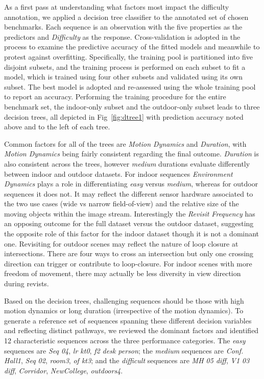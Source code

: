 As a first pass at understanding what factors most impact the difficulty
annotation, we applied a decision tree classifier to the annotated set of
chosen benchmarks.  Each sequence is an observation with the 
five
 properties as the predictors and \textit{Difficulty}
as the response. 
Cross-validation is adopted in the process to examine the predictive
accuracy of the fitted models and meanwhile to protest against overfitting.
Specifically, the training pool is partitioned into five disjoint subsets,
and the training process is performed on each subset to fit a model, which
is trained using four other subsets and validated using its own subset.
The best model is adopted and re-assessed using the whole training 
pool to report an accuracy.
Performing the training procedure for the entire benchmark set, the
indoor-only subset and the outdoor-only subset leads to three decision
trees, all depicted in Fig~\ref{fig:dtree1} with prediction accuracy noted 
above and to the left of each tree. 

Common factors for all of the trees are \textit{Motion Dynamics} and
\textit{Duration}, with \textit{Motion Dynamics} being fairly consistent
regarding the final outcome. \textit{Duration} is also consistent across
the trees, however \textit{medium} durations evaluate differently between
indoor and outdoor datasets.
For indoor sequences \textit{Environment Dynamics} plays a role in
differentiating \textit{easy} versus \textit{medium}, whereas for outdoor
sequences it does not. It may reflect the different sensor hardware
associated to the two use cases (wide vs narrow field-of-view) and the
relative size of the moving objects within the image stream.
Interestingly the \textit{Revisit Frequency} has an opposing outcome for the
full dataset versus the outdoor dataset, suggesting the opposite role
of this factor for the indoor dataset though it is not a dominant one.
Revisiting for outdoor scenes may reflect the nature of loop closure at
intersections. There are four ways to cross an intersection but only one
crossing direction can trigger or contribute to loop-closure. For indoor
scenes with more freedom of movement, there may actually be less diversity
in view direction during revists.



Based on the decision trees, challenging sequences should be those with high
motion dynamics or long duration (irrespective of the motion dynamics).
To generate a reference set of sequences spanning these different decision
variables and reflecting distinct pathways, we reviewed the dominant
factors and identified 12 characteristic sequences across the three
performance categories.  
The \textit{easy} sequences are \textit{Seq 04}, 
\textit{lr kt0}, 
\textit{f2 desk person};
the \textit{medium} sequences are 
\textit{Conf. Hall1}, 
\textit{Seq 02}, 
\textit{room3}, \textit{of kt3}; and the
\textit{difficult} sequences are \textit{MH 05 diff}, \textit{V1 03 diff}, 
\textit{Corridor}, \textit{NewCollege}, \textit{outdoors4}.
